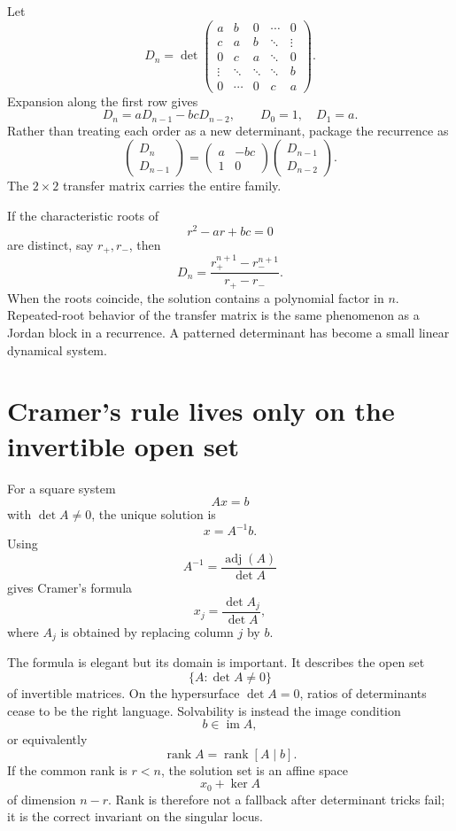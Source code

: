 Let
\[
  D_n=\det
  \begin{pmatrix}
    a&b&0&\cdots&0\\
    c&a&b&\ddots&\vdots\\
    0&c&a&\ddots&0\\
    \vdots&\ddots&\ddots&\ddots&b\\
    0&\cdots&0&c&a
  \end{pmatrix}.
\]
Expansion along the first row gives
\[
  D_n=aD_{n-1}-bcD_{n-2},
  \qquad
  D_0=1,
  \quad
  D_1=a.
\]
Rather than treating each order as a new determinant, package the recurrence as
\[
  \begin{pmatrix}D_n\\D_{n-1}\end{pmatrix}
  =
  \begin{pmatrix}
    a&-bc\\
    1&0
  \end{pmatrix}
  \begin{pmatrix}D_{n-1}\\D_{n-2}\end{pmatrix}.
\]
The \(2\times2\) transfer matrix carries the entire family.

If the characteristic roots of
\[
  r^2-ar+bc=0
\]
are distinct, say \(r_+,r_-\), then
\[
  D_n
  =\frac{r_+^{n+1}-r_-^{n+1}}{r_+-r_-}.
\]
When the roots coincide, the solution contains a polynomial factor in \(n\).  Repeated-root behavior of the transfer matrix is the same phenomenon as a Jordan block in a recurrence.  A patterned determinant has become a small linear dynamical system.

\section{Cramer's rule lives only on the invertible open set}

For a square system
\[
  Ax=b
\]
with \(\det A\ne0\), the unique solution is
\[
  x=A^{-1}b.
\]
Using
\[
  A^{-1}=\frac{\operatorname{adj}(A)}{\det A}
\]
gives Cramer's formula
\[
  x_j=\frac{\det A_j}{\det A},
\]
where \(A_j\) is obtained by replacing column \(j\) by \(b\).

The formula is elegant but its domain is important.  It describes the open set
\[
  \{A:\det A\ne0\}
\]
of invertible matrices.  On the hypersurface \(\det A=0\), ratios of determinants cease to be the right language.  Solvability is instead the image condition
\[
  b\in\operatorname{im}A,
\]
or equivalently
\[
  \operatorname{rank}A
  =\operatorname{rank}[A\mid b].
\]
If the common rank is \(r<n\), the solution set is an affine space
\[
  x_0+\ker A
\]
of dimension \(n-r\).  Rank is therefore not a fallback after determinant tricks fail; it is the correct invariant on the singular locus.

